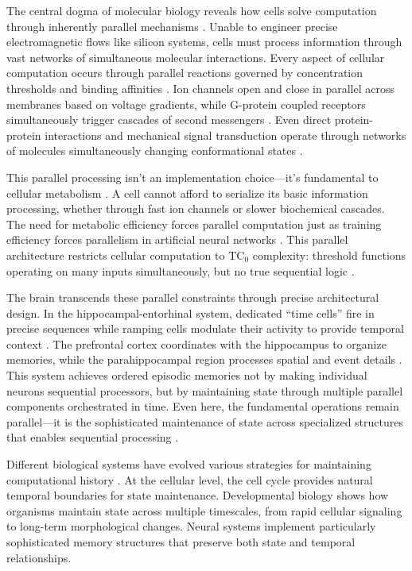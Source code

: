 \documentclass[12pt]{article}
\begin{document}
The central dogma of molecular biology reveals how cells solve computation through inherently parallel mechanisms \cite{wang2023parallel,cai2024efficient,fu2023scgrn}.
Unable to engineer precise electromagnetic flows like silicon systems, cells must process information through vast networks of simultaneous molecular interactions.
Every aspect of cellular computation occurs through parallel reactions governed by concentration thresholds and binding affinities \cite{alberts2022molecular}.
Ion channels open and close in parallel across membranes based on voltage gradients, while G-protein coupled receptors simultaneously trigger cascades of second messengers \cite{alberts2022molecular}.
Even direct protein-protein interactions and mechanical signal transduction operate through networks of molecules simultaneously changing conformational states \cite{alberts2022molecular,berridge2014cell}.

This parallel processing isn't an implementation choice---it's fundamental to cellular metabolism \cite{cai2024efficient,hoel2020emergence}.
A cell cannot afford to serialize its basic information processing, whether through fast ion channels or slower biochemical cascades.
The need for metabolic efficiency forces parallel computation just as training efficiency forces parallelism in artificial neural networks \cite{barrett2019analyzing}.
This parallel architecture restricts cellular computation to $\text{TC}_0$ complexity: threshold functions operating on many inputs simultaneously, but no true sequential logic \cite{wang2023parallel}.

The brain transcends these parallel constraints through precise architectural design.
In the hippocampal-entorhinal system, dedicated ``time cells'' fire in precise sequences while ramping cells modulate their activity to provide temporal context \cite{quentin2019differential}.
The prefrontal cortex coordinates with the hippocampus to organize memories, while the parahippocampal region processes spatial and event details \cite{martini2015information}.
This system achieves ordered episodic memories not by making individual neurons sequential processors, but by maintaining state through multiple parallel components orchestrated in time.
Even here, the fundamental operations remain parallel---it is the sophisticated maintenance of state across specialized structures that enables sequential processing \cite{bruno2022epigenetic}.

Different biological systems have evolved various strategies for maintaining computational history \cite{espinosa2024molecular}.
At the cellular level, the cell cycle provides natural temporal boundaries for state maintenance.
Developmental biology shows how organisms maintain state across multiple timescales, from rapid cellular signaling to long-term morphological changes.
Neural systems implement particularly sophisticated memory structures that preserve both state and temporal relationships.
\end{document}
